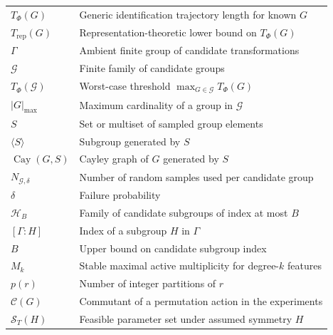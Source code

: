 \documentclass[11pt]{article}
\theoremstyle{plain}
\theoremstyle{definition}
\theoremstyle{remark}
\begin{document}
\begin{table}[h]
\begin{tabular}{ll}
\(T_\Phi(G)\) & Generic identification trajectory length for known \(G\) \\
\(T_{\mathrm{rep}}(G)\) &
Representation-theoretic lower bound on \(T_\Phi(G)\) \\
\(\Gamma\) & Ambient finite group of candidate transformations \\
\(\mathcal G\) & Finite family of candidate groups \\
\(T_\Phi(\mathcal G)\) &
Worst-case threshold \(\max_{G\in\mathcal G}T_\Phi(G)\) \\
\(|G|_{\max}\) & Maximum cardinality of a group in \(\mathcal G\) \\
\(S\) & Set or multiset of sampled group elements \\
\(\langle S\rangle\) & Subgroup generated by \(S\) \\
\(\operatorname{Cay}(G,S)\) & Cayley graph of \(G\) generated by \(S\) \\
\(N_{\mathcal G,\delta}\) &
Number of random samples used per candidate group \\
\(\delta\) & Failure probability \\
\(\mathcal H_B\) & Family of candidate subgroups of index at most \(B\) \\
\([\Gamma:H]\) & Index of a subgroup \(H\) in \(\Gamma\) \\
\(B\) & Upper bound on candidate subgroup index \\
\(M_k\) & Stable maximal active multiplicity for degree-\(k\) features \\
\(p(r)\) & Number of integer partitions of \(r\) \\
\(\mathcal C(G)\) & Commutant of a permutation action in the experiments \\
\(\mathcal S_T(H)\) & Feasible parameter set under assumed symmetry \(H\) \\
\bottomrule
\end{tabular}
\label{tab:notation}
\end{table}

 



  
\end{document}
